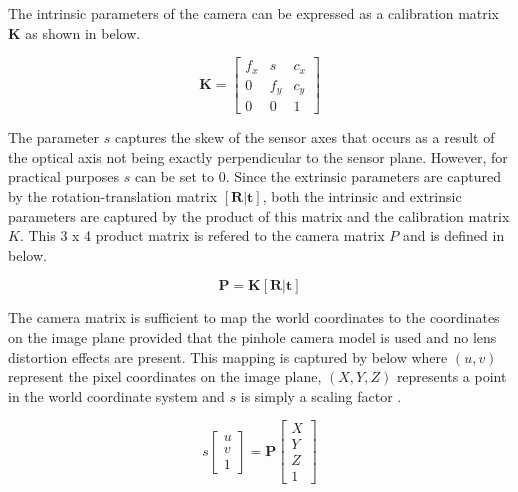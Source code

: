 The intrinsic parameters of the camera can be expressed as a calibration matrix $\textbf{K}$ as shown in  below.

\begin{equation}
    \textbf{K}=
    \begin{bmatrix}
        f_x & s & c_x \\ 
        0 & f_y & c_y \\ 
        0 & 0 & 1
    \end{bmatrix}
  \label{eqn:calibration-matrix}
\end{equation}

The parameter $s$ captures the skew of the sensor axes that occurs as a result of the optical axis not being exactly perpendicular to the sensor plane. However, for practical purposes $s$ can be set to 0. Since the extrinsic parameters are captured by the rotation-translation matrix $[\textbf{R}|\textbf{t}]$, both the intrinsic and extrinsic parameters are captured by the product of this matrix and the calibration matrix $K$. This 3 x 4 product matrix is refered to the camera matrix $P$ and is defined in  below.

\begin{equation}
    \textbf{P}=\textbf{K}[\textbf{R}|\textbf{t}]
  \label{eqn:camera-matrix}
\end{equation}

The camera matrix is sufficient to map the world coordinates to the coordinates on the image plane provided that the pinhole camera model is used and no lens distortion effects are present. This mapping is captured by  below where $(u,v)$ represent the pixel coordinates on the image plane, $(X,Y,Z)$ represents a point in the world coordinate system and $s$ is simply a scaling factor \cite{OpenCVCameraCalibration}.

\begin{equation}
    s
    \begin{bmatrix}
        u \\ 
        v \\ 
        1
    \end{bmatrix}
    =
    \textbf{P}
    \begin{bmatrix}
        X \\ 
        Y \\ 
        Z \\
        1
    \end{bmatrix}
  \label{eqn:pinhole-camera-mapping}
\end{equation}

